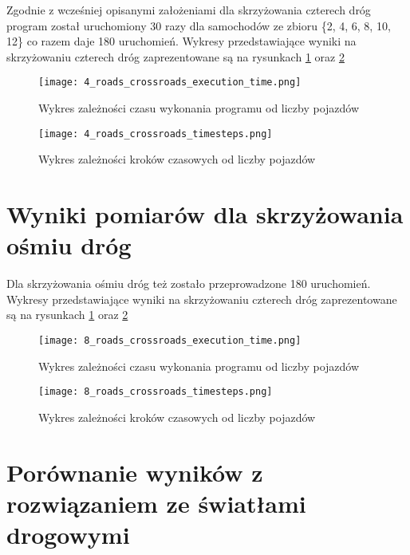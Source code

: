 Zgodnie z wcześniej opisanymi założeniami dla skrzyżowania czterech dróg program został uruchomiony 30 razy dla samochodów ze zbioru \{2, 4, 6, 8, 10, 12\} co razem daje 180 uruchomień.
\newline
\newline
Wykresy przedstawiające wyniki na skrzyżowaniu czterech dróg zaprezentowane są na rysunkach \ref{four-roads-crossroads-execution-time} oraz \ref{four-roads-crossroads-timesteps}
\begin{figure}[ht]
  \texttt{[image: 4\_roads\_crossroads\_execution\_time.png]}
  \caption{Wykres zależności czasu wykonania programu od liczby pojazdów}
  \label{four-roads-crossroads-execution-time}
\end{figure}
\begin{figure}[ht]
  \texttt{[image: 4\_roads\_crossroads\_timesteps.png]}
  \caption{Wykres zależności kroków czasowych od liczby pojazdów}
  \label{four-roads-crossroads-timesteps}
\end{figure}

\section{Wyniki pomiarów dla skrzyżowania ośmiu dróg}

Dla skrzyżowania ośmiu dróg też zostało przeprowadzone 180 uruchomień.
\newline
\newline
Wykresy przedstawiające wyniki na skrzyżowaniu czterech dróg zaprezentowane są na rysunkach \ref{four-roads-crossroads-execution-time} oraz \ref{four-roads-crossroads-timesteps}
\begin{figure}[H]
    \texttt{[image: 8\_roads\_crossroads\_execution\_time.png]}
  \caption{Wykres zależności czasu wykonania programu od liczby pojazdów}
  \label{eight-roads-crossroads-execution-time}
\end{figure}
\begin{figure}[H]
    \texttt{[image: 8\_roads\_crossroads\_timesteps.png]}
  \caption{Wykres zależności kroków czasowych od liczby pojazdów}
  \label{eight-roads-crossroads-timesteps}
\end{figure}

\section{Porównanie wyników z rozwiązaniem ze światłami drogowymi}

